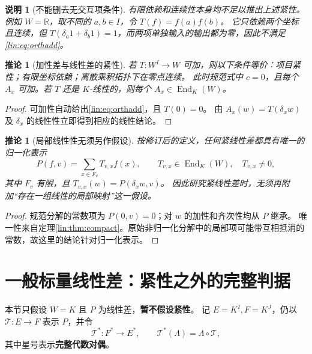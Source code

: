 \documentclass[11pt,a4paper,oneside,openany]{book}
\theoremstyle{lecture}
\newtheorem{corollary}[theorem]{推论}
\newtheorem{remark}[theorem]{说明}
\newcommand{\R}{\mathbb R}
\newcommand{\End}{\operatorname{End}}
\newcommand{\T}{\mathcal T}
\numberwithin{equation}{section}
\begin{document}
\begin{remark}[不能删去无交互项条件]
有限依赖和连续性本身均不足以推出上述紧性。
例如 $W=\R$，取不同的 $a,b\in I$，令 $T(f)=f(a)f(b)$。
它只依赖两个坐标且连续，但
$T(\delta_a1+\delta_b1)=1$，而两项单独输入的输出都为零，因此不满足\eqref{lin:eq:orthadd}。
\end{remark}

\begin{corollary}[加性差与线性差的紧性]\label{lin:cor:lincompact}
若 $T:W^I\to W$ 可加，则以下条件等价：项目紧性；有限坐标依赖；离散乘积拓扑下在零点连续。
此时规范式中 $c=0$，且每个 $A_x$ 可加。若 $T$ 还是 $K$-线性的，则每个 $A_x\in\End_K(W)$。
\end{corollary}
\begin{proof}
可加性自动给出\eqref{lin:eq:orthadd}，且 $T(0)=0$。
由 $A_x(w)=T(\delta_xw)$ 及 $\delta_x$ 的线性性立即得到相应的线性结论。
\end{proof}

\begin{corollary}[局部线性性无须另作假设]\label{lin:cor:autolocal}
按修订后的定义，任何紧线性差都具有唯一的归一化表示
\[
 P(f,v)=\sum_{x\in F_v}T_{v,x}f(x),\qquad
 T_{v,x}\in\End_K(W),\quad T_{v,x}\ne0,
\]
其中 $F_v$ 有限，且 $T_{v,x}(w)=P(\delta_xw,v)$。
因此研究紧线性差时，无须再附加“存在一组线性的局部映射”这一假设。
\end{corollary}
\begin{proof}
规范分解的常数项为 $P(0,v)=0$；对 $w$ 的加性和齐次性均从 $P$ 继承。
唯一性来自定理\ref{lin:thm:compact}。原始非归一化分解中的局部项可能带互相抵消的常数，故这里的结论针对归一化表示。
\end{proof}

\section{一般标量线性差：紧性之外的完整判据}\label{lin:sec:noncompact}
本节只假设 $W=K$ 且 $P$ 为线性差，\textbf{暂不假设紧性}。
记 $E=K^I,F=K^J$，仍以 $\T:E\to F$ 表示 $P$，并令
\[
 \T^*:F^*\to E^*,\qquad \T^*(\Lambda)=\Lambda\circ\T,
\]
其中星号表示\textbf{完整代数对偶}。
\end{document}
